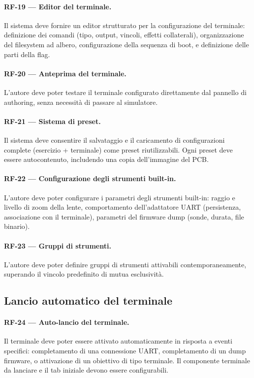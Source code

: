 \paragraph{RF-19 --- Editor del terminale.} Il sistema deve fornire un editor strutturato per la configurazione del terminale: definizione dei comandi (tipo, output, vincoli, effetti collaterali), organizzazione del filesystem ad albero, configurazione della sequenza di boot, e definizione delle parti della flag.

\paragraph{RF-20 --- Anteprima del terminale.} L'autore deve poter testare il terminale configurato direttamente dal pannello di authoring, senza necessità di passare al simulatore.

\paragraph{RF-21 --- Sistema di preset.} Il sistema deve consentire il salvataggio e il caricamento di configurazioni complete (esercizio + terminale) come preset riutilizzabili. Ogni preset deve essere autocontenuto, includendo una copia dell'immagine del PCB.

\paragraph{RF-22 --- Configurazione degli strumenti built-in.} L'autore deve poter configurare i parametri degli strumenti built-in: raggio e livello di zoom della lente, comportamento dell'adattatore UART (persistenza, associazione con il terminale), parametri del firmware dump (sonde, durata, file binario).

\paragraph{RF-23 --- Gruppi di strumenti.} L'autore deve poter definire gruppi di strumenti attivabili contemporaneamente, superando il vincolo predefinito di mutua esclusività.

\subsection{Lancio automatico del terminale}
\label{subsec:rf-auto-lancio}

\paragraph{RF-24 --- Auto-lancio del terminale.} Il terminale deve poter essere attivato automaticamente in risposta a eventi specifici: completamento di una connessione UART, completamento di un dump firmware, o attivazione di un obiettivo di tipo terminale. Il componente terminale da lanciare e il tab iniziale devono essere configurabili.

